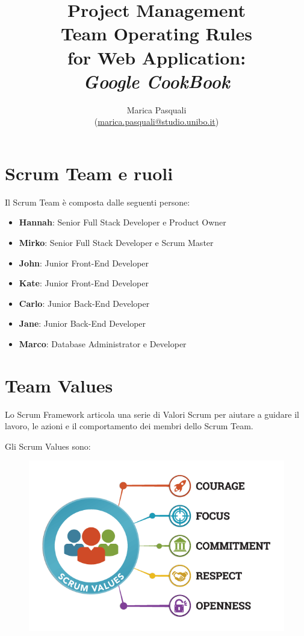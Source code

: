 \documentclass{article}
\title{
    Project Management \\
    \textbf{ 
        Team Operating Rules \\ 
        for Web Application: \\
        \textit{Google CookBook}
    }
}
\author{
    Marica Pasquali \\ 
    (\href{mailto:marica.pasquali@studio.unibo.it}{marica.pasquali@studio.unibo.it})
}
\begin{document}
\maketitle 
\newpage
\tableofcontents 
\newpage

\section{Scrum Team e ruoli}

Il Scrum Team è composta dalle seguenti persone:

\begin{itemize}
    \item \textbf{Hannah}: Senior Full Stack Developer e Product Owner
    \item \textbf{Mirko}: Senior Full Stack Developer e Scrum Master
    \item \textbf{John}: Junior Front-End Developer
    \item \textbf{Kate}: Junior Front-End Developer
    \item \textbf{Carlo}: Junior Back-End Developer
    \item \textbf{Jane}: Junior Back-End Developer
    \item \textbf{Marco}: Database Administrator e Developer
\end{itemize}

\section{Team Values}

Lo Scrum Framework articola una serie di Valori Scrum per aiutare a guidare il lavoro, le azioni e il comportamento dei membri dello Scrum Team.

Gli Scrum Values sono:

\begin{figure}[h]
    \centering
    \includegraphics[scale=0.4]{./imgs/scrum-values.png}
\end{figure}
\end{document}
